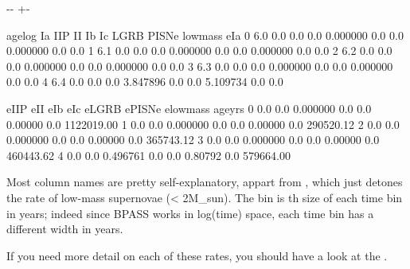 \documentclass[letterpaper,10pt,english]{sphinxmanual}
\newlength\nbsphinxcodecellspacing
\begin{document}
{

\kern-\sphinxverbatimsmallskipamount\kern-\baselineskip
\kern+\FrameHeightAdjust\kern-\fboxrule
\vspace{\nbsphinxcodecellspacing}

%
\begin{sphinxVerbatim}[commandchars=\\\{\}]
\llap{\color{nbsphinxout}[9]:\,\hspace{\fboxrule}\hspace{\fboxsep}}   age\PYGZus{}log   Ia  IIP   II        Ib   Ic  LGRB     PISNe  low\PYGZus{}mass  e\PYGZus{}Ia  \PYGZbs{}
0      6.0  0.0  0.0  0.0  0.000000  0.0   0.0  0.000000       0.0   0.0
1      6.1  0.0  0.0  0.0  0.000000  0.0   0.0  0.000000       0.0   0.0
2      6.2  0.0  0.0  0.0  0.000000  0.0   0.0  0.000000       0.0   0.0
3      6.3  0.0  0.0  0.0  0.000000  0.0   0.0  0.000000       0.0   0.0
4      6.4  0.0  0.0  0.0  3.847896  0.0   0.0  5.109734       0.0   0.0

   e\PYGZus{}IIP  e\PYGZus{}II      e\PYGZus{}Ib  e\PYGZus{}Ic  e\PYGZus{}LGRB  e\PYGZus{}PISNe  e\PYGZus{}low\PYGZus{}mass     age\PYGZus{}yrs
0    0.0   0.0  0.000000   0.0     0.0  0.00000         0.0  1122019.00
1    0.0   0.0  0.000000   0.0     0.0  0.00000         0.0   290520.12
2    0.0   0.0  0.000000   0.0     0.0  0.00000         0.0   365743.12
3    0.0   0.0  0.000000   0.0     0.0  0.00000         0.0   460443.62
4    0.0   0.0  0.496761   0.0     0.0  0.80792         0.0   579664.00
\end{sphinxVerbatim}
}

Most column names are pretty self-explanatory, appart from , which just detones the rate of low-mass supernovae (\textless{} 2M\_sun). The  bin is th size of each time bin in years; indeed since BPASS works in log(time) space, each time bin has a different width in years.

If you need more detail on each of these rates, you should have a look at the .

{
%
\begin{sphinxVerbatim}[commandchars=\\\{\}]
\llap{\color{nbsphinxin}[4]:\,\hspace{\fboxrule}\hspace{\fboxsep}}
  \PYG{p}{[}\PYG{p}{]}
  \PYG{p}{[}\PYG{p}{]}
\end{sphinxVerbatim}
}
\end{document}
